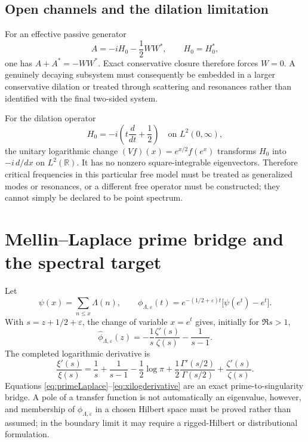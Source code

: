 \documentclass[11pt]{amsart}
\theoremstyle{definition}
\theoremstyle{remark}
\begin{document}
\subsection{Open channels and the dilation limitation}
For an effective passive generator
\begin{equation}
 A=-iH_0-\frac12WW^*,
 \qquad H_0=H_0^*,
\end{equation}
one has $A+A^*=-WW^*$.  Exact conservative closure therefore forces $W=0$.  A genuinely
decaying subsystem must consequently be embedded in a larger conservative dilation or treated
through scattering and resonances rather than identified with the final two-sided system.

For the dilation operator
\begin{equation}
 H_0=-i\left(t\frac d{dt}+\frac12\right)
 \quad\text{on }L^2(0,\infty),
\end{equation}
the unitary logarithmic change $(Vf)(x)=e^{x/2}f(e^x)$ transforms $H_0$ into
$-i\,d/dx$ on $L^2(\mathbb R)$.  It has no nonzero square-integrable eigenvectors.  Therefore
critical frequencies in this particular free model must be treated as generalized modes or
resonances, or a different free operator must be constructed; they cannot simply be declared
to be point spectrum.

\section{Mellin--Laplace prime bridge and the spectral target}
Let
\begin{equation}
 \psi(x)=\sum_{n\le x}\Lambda(n),
 \qquad
 \phi_{\Lambda,\varepsilon}(t)
 =e^{-(1/2+\varepsilon)t}\bigl[\psi(e^t)-e^t\bigr].
\end{equation}
With $s=z+1/2+\varepsilon$, the change of variable $x=e^t$ gives, initially for
$\Re s>1$,
\begin{equation}\label{eq:primeLaplace}
 \widehat\phi_{\Lambda,\varepsilon}(z)
 =-\frac1s\frac{\zeta'(s)}{\zeta(s)}-\frac1{s-1}.
\end{equation}
The completed logarithmic derivative is
\begin{equation}\label{eq:xilogderivative}
 \frac{\xi'(s)}{\xi(s)}
 =\frac1s+\frac1{s-1}-\frac12\log\pi
 +\frac12\frac{\Gamma'(s/2)}{\Gamma(s/2)}
 +\frac{\zeta'(s)}{\zeta(s)}.
\end{equation}
Equations \eqref{eq:primeLaplace}--\eqref{eq:xilogderivative} are an exact prime-to-singularity
bridge.  A pole of a transfer function is not automatically an eigenvalue, however, and
membership of $\phi_{\Lambda,\varepsilon}$ in a chosen Hilbert space must be proved rather than
assumed; in the boundary limit it may require a rigged-Hilbert or distributional formulation.
\end{document}
